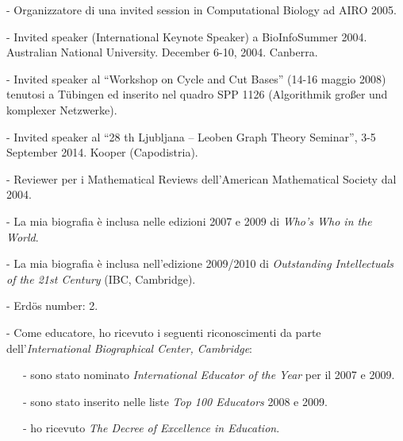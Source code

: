    - Organizzatore di una invited session in Computational Biology ad AIRO 2005.

   - Invited speaker (International Keynote Speaker) a BioInfoSummer 2004.
Australian National University. December 6-10, 2004. Canberra.

   - Invited speaker al
     ``Workshop on Cycle and Cut Bases'' (14-16 maggio 2008)
     tenutosi a T\"ubingen ed inserito nel quadro
     SPP 1126 (Algorithmik großer und komplexer Netzwerke).

   - Invited speaker al
   ``28 th Ljubljana – Leoben Graph Theory Seminar'',
   3-5 September 2014. Kooper (Capodistria). 

   - Reviewer per i Mathematical Reviews dell'American Mathematical Society
     dal 2004.

   - La mia biografia \`e inclusa nelle edizioni 2007 e 2009
     di \emph{Who's Who in the World}.

   - La mia biografia \`e inclusa nell'edizione 2009/2010
     di \emph{Outstanding Intellectuals of the 21st Century} (IBC, Cambridge).

   - Erd\"os number: 2.

   - Come educatore, ho ricevuto i seguenti riconoscimenti
     da parte dell'\emph{International Biographical Center, Cambridge}:

   \ \ \ - sono stato nominato \emph{International Educator of the Year} per il 2007 e 2009.

   \ \ \ - sono stato inserito nelle liste \emph{Top 100 Educators} 2008
           e 2009.

   \ \ \ - ho ricevuto \emph{The Decree of Excellence in Education}.

   


%
%




